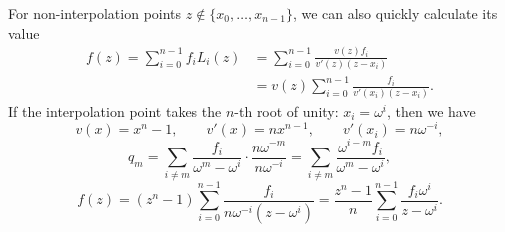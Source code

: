 For non-interpolation points $z \notin \{x_0, \ldots, x_{n-1}\}$, we can also quickly calculate its value
\begin{align*}
    f(z) = \sum_{i=0}^{n-1}f_iL_i(z)
    &= \sum_{i=0}^{n-1}\frac{v(z)f_i}{v'(z)(z-x_i)} \\
    &= v(z) \sum_{i=0}^{n-1}\frac{f_i}{v'(x_i)(z-x_i)}.
\end{align*}
If the interpolation point takes the $n$-th root of unity: $x_i=\omega^i$, then we have
\[ v(x)=x^n-1, \qquad v'(x)=nx^{n-1}, \qquad v'(x_i)=n\omega^{-i}, \]
\[ q_m = \sum_{i \ne m} \frac{f_i}{\omega^m-\omega^i} \cdot \frac{n\omega^{-m}}{n\omega^{-i}}
= \sum_{i \ne m} \frac{\omega^{i-m} f_i}{\omega^m-\omega^i}, \]
\[ f(z) = (z^n-1) \sum_{i=0}^{n-1}\frac{f_i}{n\omega^{-i}(z-\omega^i)}
= \frac{z^n-1}{n}\sum_{i=0}^{n-1}\frac{f_i\omega^i}{z-\omega^i}. \]
